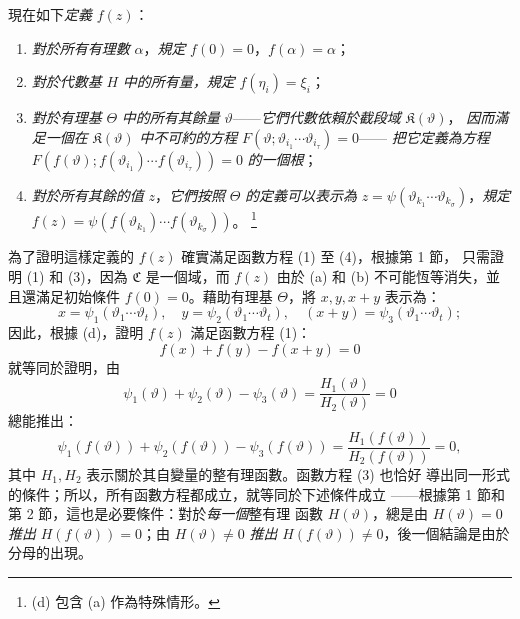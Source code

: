 \documentclass[11pt]{article}
\providecommand{\Cfield}{\mathfrak C}
\providecommand{\Kfield}{\mathfrak K}
\providecommand{\srcfn}[2]{%
  \begingroup\renewcommand{\thefootnote}{#1}\footnote{#2}\addtocounter{footnote}{-1}\endgroup}
\begin{document}
現在如下\emph{定義} \(f(z)\)：
\begin{enumerate}
\item[(a)] \emph{對於所有有理數} \(\alpha\)，\emph{規定}
\(f(0)=0\)，\(f(\alpha)=\alpha\)；
\item[(b)] \emph{對於代數基} \(H\) \emph{中的所有量，規定}
\(f(\eta_i)=\xi_i\)；
\item[(c)] \emph{對於有理基} \(\Theta\) \emph{中的所有其餘量}
\(\vartheta\)——\emph{它們代數依賴於截段域} \(\Kfield(\vartheta)\)，
\emph{因而滿足一個在} \(\Kfield(\vartheta)\) \emph{中不可約的方程}
\(F(\vartheta;\vartheta_{i_1}\cdots\vartheta_{i_\tau})=0\)——
\emph{把它定義為方程}
\(F(f(\vartheta);f(\vartheta_{i_1})\cdots f(\vartheta_{i_\tau}))=0\)
\emph{的一個根}；
\item[(d)] \emph{對於所有其餘的值} \(z\)，\emph{它們按照}
\(\Theta\) \emph{的定義可以表示為}
\(z=\psi(\vartheta_{k_1}\cdots\vartheta_{k_\sigma})\)，\emph{規定}
\(f(z)=\psi(f(\vartheta_{k_1})\cdots f(\vartheta_{k_\sigma}))\)。
\srcfn{*)}{(d) 包含 (a) 作為特殊情形。}
\end{enumerate}
為了證明這樣定義的 \(f(z)\) 確實滿足函數方程 (1) 至 (4)，根據第 1 節，
只需證明 (1) 和 (3)，因為 \(\Cfield\) 是一個域，而 \(f(z)\) 由於
(a) 和 (b) 不可能恆等消失，並且還滿足初始條件 \(f(0)=0\)。藉助有理基
\(\Theta\)，將 \(x,y,x+y\) 表示為：
\[
x=\psi_1(\vartheta_1\cdots\vartheta_t),\quad
 y=\psi_2(\vartheta_1\cdots\vartheta_t),\quad
 (x+y)=\psi_3(\vartheta_1\cdots\vartheta_t);
\]
因此，根據 (d)，證明 \(f(z)\) 滿足函數方程 (1)：
\[
f(x)+f(y)-f(x+y)=0
\]
就等同於證明，由
\[
\psi_1(\vartheta)+\psi_2(\vartheta)-\psi_3(\vartheta)
 =\frac{H_1(\vartheta)}{H_2(\vartheta)}=0
\]
總能推出：
\[
\psi_1(f(\vartheta))+\psi_2(f(\vartheta))-\psi_3(f(\vartheta))
 =\frac{H_1(f(\vartheta))}{H_2(f(\vartheta))}=0,
\]
其中 \(H_1,H_2\) 表示關於其自變量的整有理函數。函數方程 (3) 也恰好
導出同一形式的條件；所以，所有函數方程都成立，就等同於下述條件成立
——根據第 1 節和第 2 節，這也是必要條件：對於\emph{每一個}整有理
函數 \(H(\vartheta)\)，總是由 \(H(\vartheta)=0\) \emph{推出}
\(H(f(\vartheta))=0\)；由 \(H(\vartheta)\ne0\) \emph{推出}
\(H(f(\vartheta))\ne0\)，後一個結論是由於分母的出現。
\end{document}

